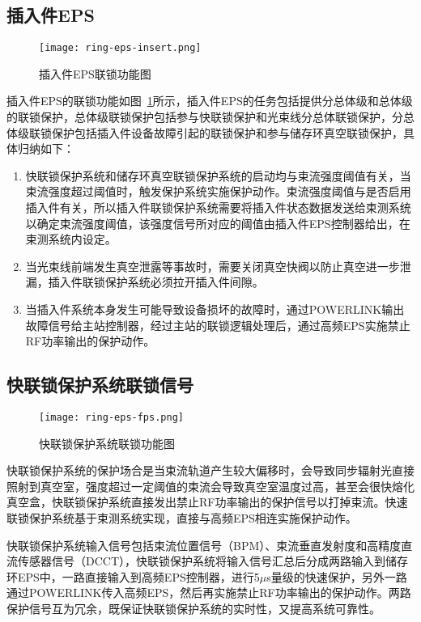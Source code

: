 \subsection{插入件EPS}

\begin{figure}[!htb]
	\centering
	\texttt{[image: ring-eps-insert.png]}
	\caption{插入件EPS联锁功能图}
	\label{fig:ring-eps-insert}
\end{figure}

插入件EPS的联锁功能如图~\ref{fig:ring-eps-insert}所示，插入件EPS的任务包括提供分总体级和总体级的联锁保护，总体级联锁保护包括参与快联锁保护和光束线分总体联锁保护，分总体级联锁保护包括插入件设备故障引起的联锁保护和参与储存环真空联锁保护，具体归纳如下：

\begin{enumerate}
  \item 快联锁保护系统和储存环真空联锁保护系统的启动均与束流强度阈值有关，当束流强度超过阈值时，触发保护系统实施保护动作。束流强度阈值与是否启用插入件有关，所以插入件联锁保护系统需要将插入件状态数据发送给束测系统以确定束流强度阈值，该强度信号所对应的阈值由插入件EPS控制器给出，在束测系统内设定。

  \item 当光束线前端发生真空泄露等事故时，需要关闭真空快阀以防止真空进一步泄漏，插入件联锁保护系统必须拉开插入件间隙。

  \item 当插入件系统本身发生可能导致设备损坏的故障时，通过POWERLINK输出故障信号给主站控制器，经过主站的联锁逻辑处理后，通过高频EPS实施禁止RF功率输出的保护动作。
\end{enumerate}


\subsection{快联锁保护系统联锁信号}

\begin{figure}[!htb]
	\centering
	\texttt{[image: ring-eps-fps.png]}
	\caption{快联锁保护系统联锁功能图}
	\label{fig:ring-eps-fps}
\end{figure}


快联锁保护系统的保护场合是当束流轨道产生较大偏移时，会导致同步辐射光直接照射到真空室，强度超过一定阈值的束流会导致真空室温度过高，甚至会很快熔化真空盒，快联锁保护系统直接发出禁止RF功率输出的保护信号以打掉束流。快速联锁保护系统基于束测系统实现，直接与高频EPS相连实施保护动作。

快联锁保护系统输入信号包括束流位置信号（BPM）、束流垂直发射度和高精度直流传感器信号（DCCT），快联锁保护系统将输入信号汇总后分成两路输入到储存环EPS中，一路直接输入到高频EPS控制器，进行5$\mu$s量级的快速保护，另外一路通过POWERLINK传入高频EPS，然后再实施禁止RF功率输出的保护动作。两路保护信号互为冗余，既保证快联锁保护系统的实时性，又提高系统可靠性。

